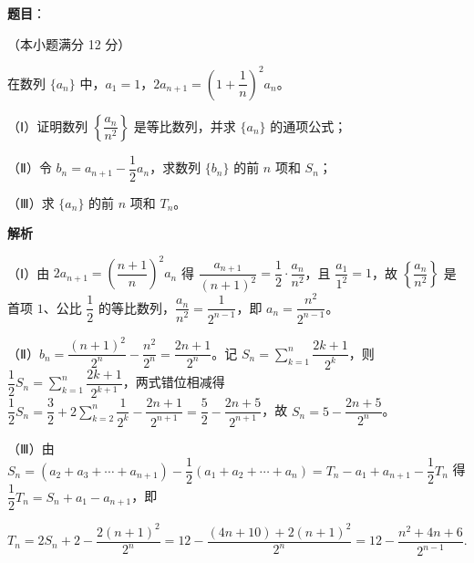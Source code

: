 \begin{answer}

\textbf{题目}：

（本小题满分 12 分）

在数列 $\{a_n\}$ 中，$a_1=1$，$2a_{n+1}=\left(1+\dfrac1n\right)^2a_n$。

（Ⅰ）证明数列 $\left\{\dfrac{a_n}{n^2}\right\}$ 是等比数列，并求 $\{a_n\}$ 的通项公式；

（Ⅱ）令 $b_n=a_{n+1}-\dfrac12a_n$，求数列 $\{b_n\}$ 的前 $n$ 项和 $S_n$；

（Ⅲ）求 $\{a_n\}$ 的前 $n$ 项和 $T_n$。

\textbf{解析}

（Ⅰ）由 $2a_{n+1}=\left(\dfrac{n+1}n\right)^2a_n$ 得 $\dfrac{a_{n+1}}{(n+1)^2}=\dfrac12\cdot\dfrac{a_n}{n^2}$，且 $\dfrac{a_1}{1^2}=1$，故 $\left\{\dfrac{a_n}{n^2}\right\}$ 是首项 $1$、公比 $\dfrac12$ 的等比数列，$\dfrac{a_n}{n^2}=\dfrac1{2^{n-1}}$，即 $a_n=\dfrac{n^2}{2^{n-1}}$。

（Ⅱ）$b_n=\dfrac{(n+1)^2}{2^n}-\dfrac{n^2}{2^n}=\dfrac{2n+1}{2^n}$。记 $S_n=\sum\limits_{k=1}^n\dfrac{2k+1}{2^k}$，则 $\dfrac12S_n=\sum\limits_{k=1}^n\dfrac{2k+1}{2^{k+1}}$，两式错位相减得 $\dfrac12S_n=\dfrac32+2\sum\limits_{k=2}^n\dfrac1{2^k}-\dfrac{2n+1}{2^{n+1}}=\dfrac52-\dfrac{2n+5}{2^{n+1}}$，故 $S_n=5-\dfrac{2n+5}{2^n}$。

（Ⅲ）由 $S_n=\left(a_2+a_3+\cdots+a_{n+1}\right)-\dfrac12\left(a_1+a_2+\cdots+a_n\right)=T_n-a_1+a_{n+1}-\dfrac12T_n$ 得 $\dfrac12T_n=S_n+a_1-a_{n+1}$，即

\nopagebreak[4]
\[T_n=2S_n+2-\frac{2(n+1)^2}{2^n}=12-\frac{(4n+10)+2(n+1)^2}{2^n}=12-\frac{n^2+4n+6}{2^{n-1}}.\]


\end{answer}
